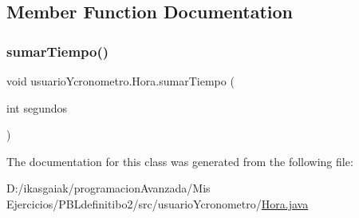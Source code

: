 \subsection{Member Function Documentation}
\mbox{\label{classusuario_ycronometro_1_1_hora_a132ed50542595839eff6cbd1c7a82f88}} 
\subsubsection{\texorpdfstring{sumar\+Tiempo()}{sumarTiempo()}}
{\footnotesize\ttfamily void usuario\+Ycronometro.\+Hora.\+sumar\+Tiempo (\begin{DoxyParamCaption}\item[{int}]{segundos }\end{DoxyParamCaption})}



The documentation for this class was generated from the following file\+:\begin{DoxyCompactItemize}
\item 
D\+:/ikasgaiak/programacion\+Avanzada/\+Mis Ejercicios/\+P\+B\+Ldefinitibo2/src/usuario\+Ycronometro/\mbox{\hyperlink{_hora_8java}{Hora.\+java}}\end{DoxyCompactItemize}
